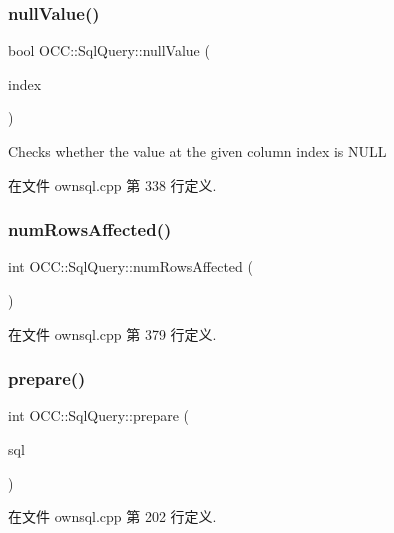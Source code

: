 \subsubsection{\texorpdfstring{null\+Value()}{nullValue()}}
{\footnotesize\ttfamily bool O\+C\+C\+::\+Sql\+Query\+::null\+Value (\begin{DoxyParamCaption}\item[{int}]{index }\end{DoxyParamCaption})}



Checks whether the value at the given column index is N\+U\+LL 



在文件 ownsql.\+cpp 第 338 行定义.

\mbox{\label{class_o_c_c_1_1_sql_query_a806da70d5525455ba84452ec84bce7c9}} 
\subsubsection{\texorpdfstring{num\+Rows\+Affected()}{numRowsAffected()}}
{\footnotesize\ttfamily int O\+C\+C\+::\+Sql\+Query\+::num\+Rows\+Affected (\begin{DoxyParamCaption}{ }\end{DoxyParamCaption})}



在文件 ownsql.\+cpp 第 379 行定义.

\mbox{\label{class_o_c_c_1_1_sql_query_a5a454f1262d942b630a9368bacffae60}} 
\subsubsection{\texorpdfstring{prepare()}{prepare()}}
{\footnotesize\ttfamily int O\+C\+C\+::\+Sql\+Query\+::prepare (\begin{DoxyParamCaption}\item[{const Q\+String \&}]{sql }\end{DoxyParamCaption})}



在文件 ownsql.\+cpp 第 202 行定义.

